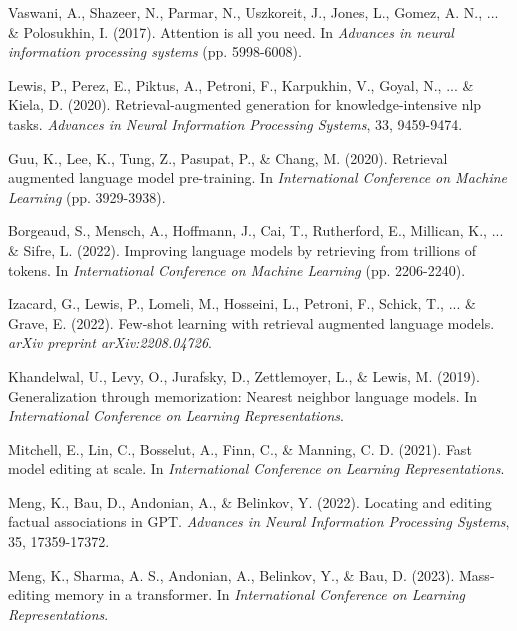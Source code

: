 \documentclass[11pt, a4paper]{article}
\theoremstyle{definition}
\begin{document}




\begin{thebibliography}{99}

Vaswani, A., Shazeer, N., Parmar, N., Uszkoreit, J., Jones, L., Gomez, A. N., ... \& Polosukhin, I. (2017). 
Attention is all you need. 
In \textit{Advances in neural information processing systems} (pp. 5998-6008).

Lewis, P., Perez, E., Piktus, A., Petroni, F., Karpukhin, V., Goyal, N., ... \& Kiela, D. (2020). 
Retrieval-augmented generation for knowledge-intensive nlp tasks. 
\textit{Advances in Neural Information Processing Systems}, 33, 9459-9474.

Guu, K., Lee, K., Tung, Z., Pasupat, P., \& Chang, M. (2020). 
Retrieval augmented language model pre-training. 
In \textit{International Conference on Machine Learning} (pp. 3929-3938).

Borgeaud, S., Mensch, A., Hoffmann, J., Cai, T., Rutherford, E., Millican, K., ... \& Sifre, L. (2022). 
Improving language models by retrieving from trillions of tokens. 
In \textit{International Conference on Machine Learning} (pp. 2206-2240).

Izacard, G., Lewis, P., Lomeli, M., Hosseini, L., Petroni, F., Schick, T., ... \& Grave, E. (2022). 
Few-shot learning with retrieval augmented language models. 
\textit{arXiv preprint arXiv:2208.04726}.

Khandelwal, U., Levy, O., Jurafsky, D., Zettlemoyer, L., \& Lewis, M. (2019). 
Generalization through memorization: Nearest neighbor language models. 
In \textit{International Conference on Learning Representations}.

Mitchell, E., Lin, C., Bosselut, A., Finn, C., \& Manning, C. D. (2021). 
Fast model editing at scale. 
In \textit{International Conference on Learning Representations}.

Meng, K., Bau, D., Andonian, A., \& Belinkov, Y. (2022). 
Locating and editing factual associations in GPT. 
\textit{Advances in Neural Information Processing Systems}, 35, 17359-17372.

Meng, K., Sharma, A. S., Andonian, A., Belinkov, Y., \& Bau, D. (2023). 
Mass-editing memory in a transformer. 
In \textit{International Conference on Learning Representations}.


\end{thebibliography}
\end{document}
